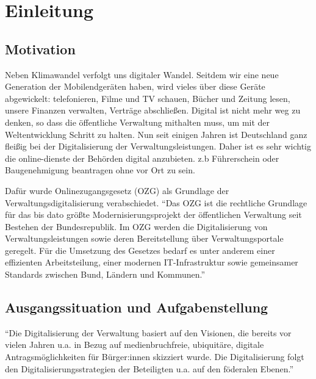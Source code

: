 \chapter{Einleitung}
\label{cha:einleitung}
\section{Motivation}

Neben Klimawandel verfolgt uns digitaler Wandel. Seitdem wir eine neue Generation der Mobilendgeräten haben, wird vieles über diese Geräte abgewickelt: telefonieren, Filme und TV schauen, Bücher und Zeitung lesen, unsere Finanzen verwalten, Verträge abschließen. Digital ist nicht mehr weg zu denken, so dass die öffentliche Verwaltung mithalten muss, um mit der Weltentwicklung Schritt zu halten. Nun seit einigen Jahren ist Deutschland ganz fleißig bei der Digitalisierung der Verwaltungsleistungen. Daher ist es sehr wichtig die online-dienste der Behörden digital anzubieten. z.b Führerschein  oder Baugenehmigung beantragen ohne vor Ort zu sein.

Dafür wurde Onlinezugangsgesetz (OZG) als Grundlage der Verwaltungsdigitalisierung verabschiedet. ``Das OZG ist die rechtliche Grundlage für das bis dato größte Modernisierungsprojekt der öffentlichen Verwaltung seit Bestehen der Bundesrepublik. Im OZG werden die Digitalisierung von Verwaltungsleistungen sowie deren Bereitstellung über Verwaltungsportale geregelt. Für die Umsetzung des Gesetzes bedarf es unter anderem einer effizienten Arbeitsteilung, einer modernen IT-Infrastruktur sowie gemeinsamer Standards zwischen Bund, Ländern und Kommunen.'' \cite{bundesministerium_des_innern_und_fur_heimat_onlinezugangsgesetz_2017}


\section{Ausgangssituation und Aufgabenstellung}
``Die Digitalisierung der Verwaltung basiert auf den Visionen, die bereits vor vielen Jahren u.a. in Bezug auf medienbruchfreie, ubiquitäre, digitale Antragsmöglichkeiten für Bürger:innen skizziert wurde. Die Digitalisierung folgt den Digitalisierungsstrategien der Beteiligten u.a. auf den föderalen Ebenen.''\cite[S.~21]{lohmann_architekturrahmen_2021}

